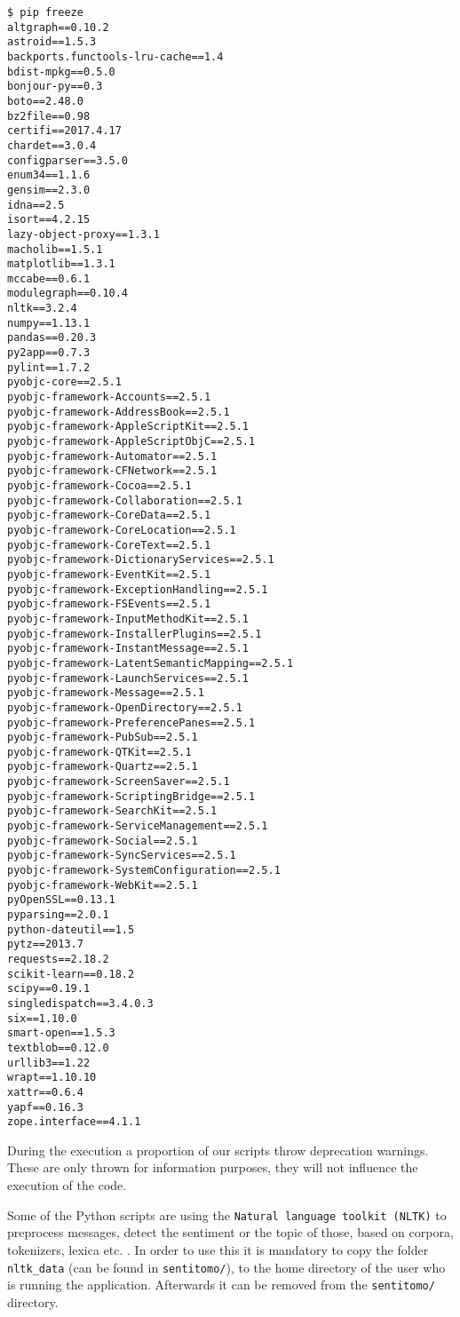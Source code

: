 \documentclass[]{article}
\begin{document}
\begin{verbatim}
$ pip freeze
altgraph==0.10.2
astroid==1.5.3
backports.functools-lru-cache==1.4
bdist-mpkg==0.5.0
bonjour-py==0.3
boto==2.48.0
bz2file==0.98
certifi==2017.4.17
chardet==3.0.4
configparser==3.5.0
enum34==1.1.6
gensim==2.3.0
idna==2.5
isort==4.2.15
lazy-object-proxy==1.3.1
macholib==1.5.1
matplotlib==1.3.1
mccabe==0.6.1
modulegraph==0.10.4
nltk==3.2.4
numpy==1.13.1
pandas==0.20.3
py2app==0.7.3
pylint==1.7.2
pyobjc-core==2.5.1
pyobjc-framework-Accounts==2.5.1
pyobjc-framework-AddressBook==2.5.1
pyobjc-framework-AppleScriptKit==2.5.1
pyobjc-framework-AppleScriptObjC==2.5.1
pyobjc-framework-Automator==2.5.1
pyobjc-framework-CFNetwork==2.5.1
pyobjc-framework-Cocoa==2.5.1
pyobjc-framework-Collaboration==2.5.1
pyobjc-framework-CoreData==2.5.1
pyobjc-framework-CoreLocation==2.5.1
pyobjc-framework-CoreText==2.5.1
pyobjc-framework-DictionaryServices==2.5.1
pyobjc-framework-EventKit==2.5.1
pyobjc-framework-ExceptionHandling==2.5.1
pyobjc-framework-FSEvents==2.5.1
pyobjc-framework-InputMethodKit==2.5.1
pyobjc-framework-InstallerPlugins==2.5.1
pyobjc-framework-InstantMessage==2.5.1
pyobjc-framework-LatentSemanticMapping==2.5.1
pyobjc-framework-LaunchServices==2.5.1
pyobjc-framework-Message==2.5.1
pyobjc-framework-OpenDirectory==2.5.1
pyobjc-framework-PreferencePanes==2.5.1
pyobjc-framework-PubSub==2.5.1
pyobjc-framework-QTKit==2.5.1
pyobjc-framework-Quartz==2.5.1
pyobjc-framework-ScreenSaver==2.5.1
pyobjc-framework-ScriptingBridge==2.5.1
pyobjc-framework-SearchKit==2.5.1
pyobjc-framework-ServiceManagement==2.5.1
pyobjc-framework-Social==2.5.1
pyobjc-framework-SyncServices==2.5.1
pyobjc-framework-SystemConfiguration==2.5.1
pyobjc-framework-WebKit==2.5.1
pyOpenSSL==0.13.1
pyparsing==2.0.1
python-dateutil==1.5
pytz==2013.7
requests==2.18.2
scikit-learn==0.18.2
scipy==0.19.1
singledispatch==3.4.0.3
six==1.10.0
smart-open==1.5.3
textblob==0.12.0
urllib3==1.22
wrapt==1.10.10
xattr==0.6.4
yapf==0.16.3
zope.interface==4.1.1
\end{verbatim}

During the execution a proportion of our scripts throw deprecation
warnings. These are only thrown for information purposes, they will not
influence the execution of the code.

Some of the Python scripts are using the
\texttt{Natural\ language\ toolkit\ (NLTK)} to preprocess messages,
detect the sentiment or the topic of those, based on corpora,
tokenizers, lexica etc. . In order to use this it is mandatory to copy
the folder \texttt{nltk\_data} (can be found in \texttt{sentitomo/}), to
the home directory of the user who is running the application.
Afterwards it can be removed from the \texttt{sentitomo/} directory.
\end{document}
